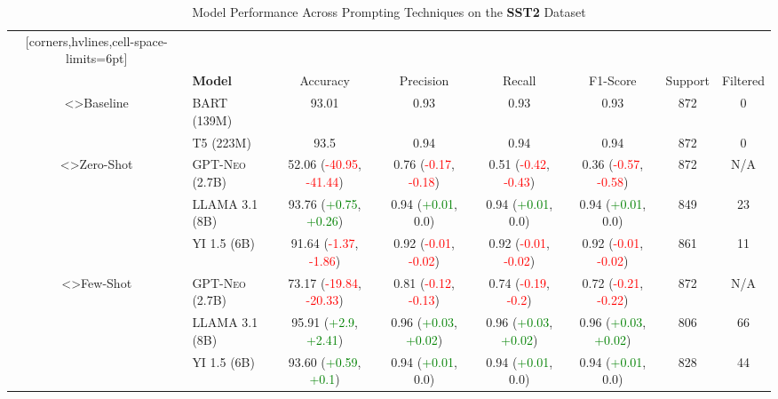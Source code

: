 \documentclass[twocolumn]{article}
\begin{document}
\begin{table}
\centering
\caption{Model Performance Across Prompting Techniques on the \textbf{SST2} Dataset}
\vspace{10pt}
\label{tab:model_performance_sst2}
\begin{NiceTabular}{cl*{6}{c}}[corners,hvlines,cell-space-limits=6pt]
    &   
        &  \\
    & \textbf{Model}  
        & Accuracy & Precision & Recall & F1-Score & Support & Filtered \\

<\rotate>{Baseline}
	 & \textsc{BART (139M)} & 93.01 & 0.93 & 0.93 & 0.93 & 872 & 0 \\
	 & \textsc{T5 (223M)} & 93.5 & 0.94 & 0.94 & 0.94 & 872 & 0 \\

<\rotate>{Zero-Shot}
	 & \textsc{GPT-Neo (2.7B)} & 52.06 (\textcolor{Red}{-40.95}, \textcolor{Red}{-41.44}) & 0.76 (\textcolor{Red}{-0.17}, \textcolor{Red}{-0.18}) & 0.51 (\textcolor{Red}{-0.42}, \textcolor{Red}{-0.43}) & 0.36 (\textcolor{Red}{-0.57}, \textcolor{Red}{-0.58}) & 872 & N/A \\
	 & \textsc{LLAMA 3.1 (8B)} & 93.76 (\textcolor{Green}{+0.75}, \textcolor{Green}{+0.26}) & 0.94 (\textcolor{Green}{+0.01}, 0.0) & 0.94 (\textcolor{Green}{+0.01}, 0.0) & 0.94 (\textcolor{Green}{+0.01}, 0.0) & 849 & 23 \\
	 & \textsc{YI 1.5 (6B)} & 91.64 (\textcolor{Red}{-1.37}, \textcolor{Red}{-1.86}) & 0.92 (\textcolor{Red}{-0.01}, \textcolor{Red}{-0.02}) & 0.92 (\textcolor{Red}{-0.01}, \textcolor{Red}{-0.02}) & 0.92 (\textcolor{Red}{-0.01}, \textcolor{Red}{-0.02}) & 861 & 11 \\

<\rotate>{Few-Shot}
	 & \textsc{GPT-Neo (2.7B)} & 73.17 (\textcolor{Red}{-19.84}, \textcolor{Red}{-20.33}) & 0.81 (\textcolor{Red}{-0.12}, \textcolor{Red}{-0.13}) & 0.74 (\textcolor{Red}{-0.19}, \textcolor{Red}{-0.2}) & 0.72 (\textcolor{Red}{-0.21}, \textcolor{Red}{-0.22}) & 872 & N/A \\
	 & \textsc{LLAMA 3.1 (8B)} & 95.91 (\textcolor{Green}{+2.9}, \textcolor{Green}{+2.41}) & 0.96 (\textcolor{Green}{+0.03}, \textcolor{Green}{+0.02}) & 0.96 (\textcolor{Green}{+0.03}, \textcolor{Green}{+0.02}) & 0.96 (\textcolor{Green}{+0.03}, \textcolor{Green}{+0.02}) & 806 & 66 \\
	 & \textsc{YI 1.5 (6B)} & 93.60 (\textcolor{Green}{+0.59}, \textcolor{Green}{+0.1}) & 0.94 (\textcolor{Green}{+0.01}, 0.0) & 0.94 (\textcolor{Green}{+0.01}, 0.0) & 0.94 (\textcolor{Green}{+0.01}, 0.0) & 828 & 44 \\


\end{NiceTabular}
\end{table}
\end{document}
